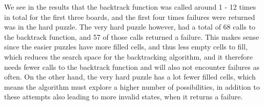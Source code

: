 \documentclass{article}
\begin{document}
    We see in the results that the backtrack function was called around 1 - 12 
    times in total for the first three boards, and the first four times failures
    were returned was in the hard puzzle. The very hard puzzle however, had a total
    of 68 calls to the backtrack function, and 57 of those calls returned a failure.
    This makes sense since the easier puzzles have more filled cells, and thus
    less empty cells to fill, which reduces the search space for the backtracking
    algorithm, and it therefore needs fewer calls to the backtrack function and will also
    not encounter failures as often. On the other hand, the very hard puzzle has a lot
    fewer filled cells, which means the algorithm must explore a higher number of possibilities,
    in addition to these attempts also leading to more invalid states, when it returns 
    a failure. 

\end{document}
